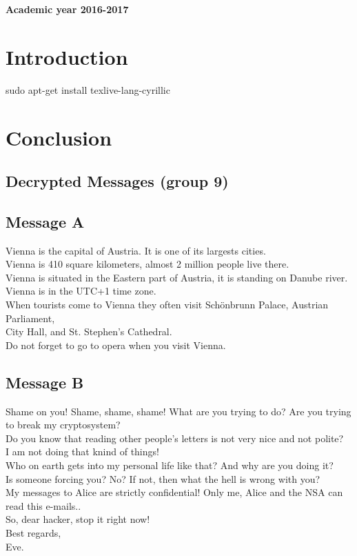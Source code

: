 \documentclass[a4paper,10pt]{article}
\begin{document}
\begin{titlepage}
\begin{center}
		\textbf{Academic year 2016-2017}

        
    \end{center}
\end{titlepage}
\newpage
\tableofcontents
\pagebreak

\section{Introduction}

sudo apt-get install texlive-lang-cyrillic

\section{Conclusion}


\newpage

\begin{appendices}

\section{Decrypted Messages (group 9)}

\subsection{Message A}
Vienna is the capital of Austria. It is one of its largests cities.\\
Vienna is 410 square kilometers, almost 2 million people live there.\\
Vienna is situated in the Eastern part of Austria, it is standing on Danube river.\\
Vienna is in the UTC+1 time zone.\\
When tourists come to Vienna they often visit  Schönbrunn Palace, Austrian Parliament,\\
City Hall, and St. Stephen's Cathedral.\\
Do not forget to go to opera when you visit Vienna.\\

\subsection{Message B}
Shame on you! Shame, shame, shame!
What are you trying to do? Are you trying to break my cryptosystem?\\
Do you know that reading other people's letters is not very nice and not polite?\\
I am not doing that knind of things!\\
Who on earth gets into my personal life like that? And why are you doing it?\\
Is someone forcing you? No? If not, then what the hell is wrong with you?\\
My messages to Alice are strictly confidential! Only me, Alice and the NSA can read this e-mails..\\
So, dear hacker, stop it right now!\\
Best regards,\\
Eve.\\


\end{appendices}
\end{document}

